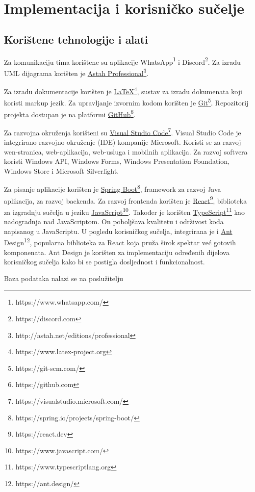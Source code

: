 \chapter{Implementacija i korisničko sučelje}


\section{Korištene tehnologije i alati}

\noindent Za komunikaciju tima korištene su aplikacije \underline{WhatsApp}\footnote{https://www.whatsapp.com/} i \underline{Discord}\footnote{https://discord.com}. Za izradu UML dijagrama korišten je \underline{Astah Professional}\footnote{http://astah.net/editions/professional}.

Za izradu dokumentacije korišten je \underline{LaTeX}\footnote{https://www.latex-project.org}, sustav za izradu dokumenata koji koristi markup jezik. Za upravljanje izvornim kodom korišten je \underline{Git}\footnote{https://git-scm.com/}. Repozitorij projekta dostupan je na platformi \underline{GitHub}\footnote{https://github.com}.

Za razvojna okruženja korišteni su \underline{Visual Studio Code}\footnote{https://visualstudio.microsoft.com/}. Visual Studio Code je integrirano razvojno okruženje (IDE) kompanije Microsoft. Koristi se za razvoj wen-stranica, web-aplikacija, web-usluga i mobilnih aplikacija. Za razvoj softvera koristi Windows API, Windows Forms, Windows Presentation Foundation, Windows Store i Microsoft Silverlight.

Za pisanje aplikacije korišten je \underline{Spring Boot}\footnote{https://spring.io/projects/spring-boot/}, framework za razvoj Java aplikacija, za razvoj backenda. Za razvoj frontenda korišten je \underline{React}\footnote{https://react.dev}, biblioteka za izgradnju sučelja u jeziku \underline{JavaScript}\footnote{https://www.javascript.com/}. Također je korišten \underline{TypeScript}\footnote{https://www.typescriptlang.org} kao nadogradnja nad JavaScriptom. On poboljšava kvalitetu i održivost koda napisanog u JavaScriptu. U pogledu korisničkog sučelja, integrirana je i \underline{Ant Design}\footnote{https://ant.design/}, popularna biblioteka za React koja pruža širok spektar već gotovih komponenata. Ant Design je korišten za implementaciju određenih dijelova korisničkog sučelja kako bi se postigla dosljednost i funkcionalnost.


Baza podataka nalazi se na poslužitelju 

